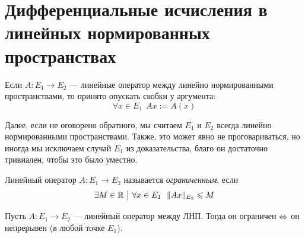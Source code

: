 \section{Дифференциальные исчисления в линейных нормированных пространствах}

\begin{note}
	Если $A \colon E_1 \to E_2$ --- линейные оператор между линейно нормированными пространствами, то принято опускать скобки у аргумента:
	\[
		\forall x \in E_1\ \ Ax := A(x)
	\]
\end{note}

\begin{note}
	Далее, если не оговорено обратного, мы считаем $E_1$ и $E_2$ всегда линейно нормированными пространствами. Также, это может явно не проговариваться, но иногда мы исключаем случай $E_1$ из доказательства, благо он достаточно тривиален, чтобы это было уместно.
\end{note}

\begin{definition}
    Линейный оператор $A \colon E_1 \to E_2$ называется \textit{ограниченным}, если 
    \[
        \exists M \in \R \such \forall x \in E_1\ \ \|Ax\|_{E_2} \leq M
    \]
\end{definition}

\begin{theorem}
	Пусть $A \colon E_1 \to E_2$ --- линейный оператор между ЛНП. Тогда он ограничен $\Leftrightarrow$ он непрерывен (в любой точке $E_1$).
\end{theorem}

